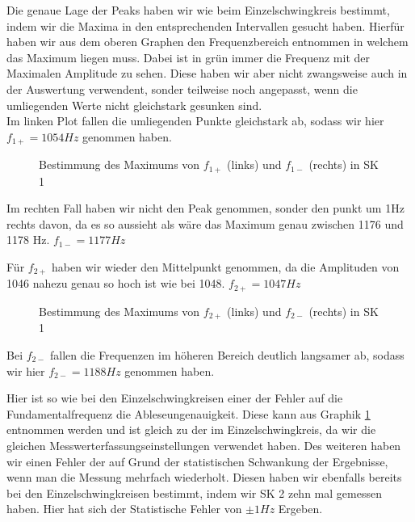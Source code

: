 \documentclass[twoside]{protokoll}
\begin{document}
Die genaue Lage der Peaks haben wir wie beim Einzelschwingkreis bestimmt, indem wir die Maxima in den entsprechenden Intervallen gesucht haben.
Hierfür haben wir aus dem oberen Graphen den Frequenzbereich entnommen in welchem das Maximum liegen muss.
Dabei ist in grün immer die Frequenz mit der Maximalen Amplitude zu sehen. Diese  haben wir aber nicht zwangsweise auch in der Auswertung verwendent, sonder teilweise noch angepasst, wenn die umliegenden Werte nicht gleichstark gesunken sind.\\

Im linken Plot fallen die umliegenden Punkte gleichstark ab, sodass wir hier $f_{1+} = 1054 Hz$ genommen haben.
\begin{figure}[H]
    \centering
    \hfill
    \caption{Bestimmung des Maximums von $f_{1+}$ (links) und $f_{1-}$ (rechts) in SK 1}
    \label{Schwebung_Maxima}
\end{figure}
Im rechten Fall haben wir nicht den Peak genommen, sonder den punkt um 1Hz rechts davon, da es so aussieht als wäre das  Maximum genau zwischen 1176 und 1178 Hz. $f_{1-} = 1177 Hz$
 
Für $f_{2+}$ haben wir wieder den Mittelpunkt genommen, da die Amplituden von 1046 nahezu genau so hoch ist wie bei 1048. $f_{2+} = 1047 Hz$
\begin{figure}[H]
    \centering
    \hfill
    \caption{Bestimmung des Maximums von $f_{2+}$ (links) und $f_{2-}$ (rechts) in SK 1}
\end{figure}
Bei $f_{2-}$ fallen die Frequenzen im höheren Bereich deutlich langsamer ab, sodass wir hier $f_{2-} = 1188 Hz$ genommen haben.
 

Hier ist so wie bei den Einzelschwingkreisen einer der Fehler auf die Fundamentalfrequenz die Ableseungenauigkeit. Diese kann aus Graphik \ref{Schwebung_Maxima} entnommen werden und ist gleich zu der im Einzelschwingkreis, da wir die gleichen Messwerterfassungseinstellungen verwendet haben.
Des weiteren haben wir einen Fehler der auf Grund der statistischen Schwankung der Ergebnisse, wenn man die Messung mehrfach wiederholt. 
Diesen haben wir ebenfalls bereits bei den Einzelschwingkreisen bestimmt, indem wir SK 2 zehn mal gemessen haben. 
Hier hat sich der Statistische Fehler von $\pm 1Hz$ Ergeben.\\
\end{document}
